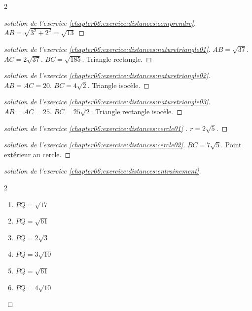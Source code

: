 \documentclass[main.tex]{subfiles}
\begin{document}
\begin{multicols}{2}
\begin{proof}[solution de l'exercice \ref{chapter06:exercice:distances:comprendre}]  $	AB=\sqrt{3^2+2^2}=\sqrt{13}$ \hfill 
	
	
\noindent	{} 
\end{proof}
\begin{proof}[solution de l'exercice \ref{chapter06:exercice:distances:naturetriangle01}]   
	$AB=\sqrt{37}$. $AC=2\sqrt{37}$. $BC=\sqrt{185}$. Triangle   rectangle. 
\end{proof}
\begin{proof}[solution de l'exercice \ref{chapter06:exercice:distances:naturetriangle02}]   
	$AB=AC=20$. $BC=4\sqrt{2}$. Triangle   isocèle. 
\end{proof}
\begin{proof}[solution de l'exercice \ref{chapter06:exercice:distances:naturetriangle03}]   
	$AB=AC=25$. $BC=25\sqrt{2}$. Triangle rectangle isocèle. 
\end{proof}
\begin{proof}[solution de l'exercice \ref{chapter06:exercice:distances:cercle01} ]   
	$r=2\sqrt{5}$.
\end{proof}
\begin{proof}[solution de l'exercice \ref{chapter06:exercice:distances:cercle02}]   
	$BC=7\sqrt{5}$. Point extérieur au cercle.
\end{proof}
\begin{proof}[solution de l'exercice \ref{chapter06:exercice:distances:entrainement}] \hfill 
	\begin{multicols}{2}
		\begin{enumerate}[leftmargin=*,label=\alph*)]
			\item $PQ=\sqrt{17}$
			\item $PQ=\sqrt{61}$
			\item $PQ=2\sqrt{3}$
			\item $PQ=3\sqrt{10}$
			\item $PQ=\sqrt{61}$
			\item $PQ=4\sqrt{10}$
		\end{enumerate}
	\end{multicols}
\end{proof}


\end{multicols}
\end{document}
